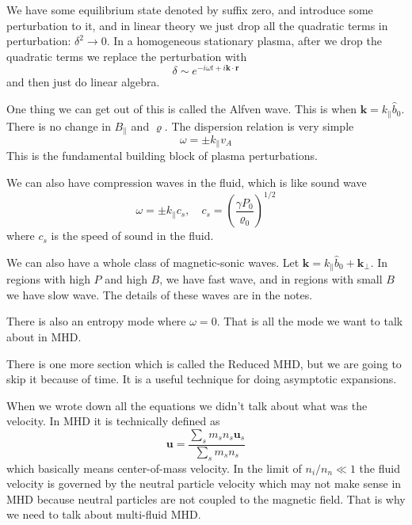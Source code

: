 \documentclass[letterpaper, 11pt]{article}
\numberwithin{equation}{section}
\numberwithin{figure}{section}
\begin{document}
We have some equilibrium state denoted by suffix zero, and introduce some
perturbation to it, and in linear theory we just drop all the quadratic terms in
perturbation: $\delta^2 \longrightarrow 0$. In a homogeneous stationary plasma,
after we drop the quadratic terms we replace the perturbation with
\begin{equation}
  \label{eq:13}
  \delta \sim e^{-i\omega t + i\mathbf{k}\cdot \mathbf{r}}
\end{equation}
and then just do linear algebra.

One thing we can get out of this is called the Alfven wave. This is when
$\mathbf{k} = k_{\parallel}\hat{b}_0$. There is no change in $B_{\parallel}$ and
$\varrho$. The dispersion relation is very simple
\begin{equation}
  \label{eq:14}
  \omega = \pm k_{\parallel}v_A
\end{equation}
This is the fundamental building block of plasma perturbations.

We can also have compression waves in the fluid, which is like sound wave
\begin{equation}
  \label{eq:15}
  \omega = \pm k_{\parallel}c_s,\quad c_s = \left( \frac{\gamma P_0}{\varrho_{0}} \right)^{1/2}
\end{equation}
where $c_s$ is the speed of sound in the fluid.

We can also have a whole class of magnetic-sonic waves. Let $\mathbf{k} =
k_{\parallel}\hat{b}_0 + \mathbf{k}_{\perp}$. In regions with high $P$ and high
$B$, we have fast wave, and in regions with small $B$ we have slow wave. The
details of these waves are in the notes.

There is also an entropy mode where $\omega = 0$. That is all the mode we want
to talk about in MHD.

There is one more section which is called the Reduced MHD, but we are going to
skip it because of time. It is a useful technique for doing asymptotic
expansions.

When we wrote down all the equations we didn't talk about what was the velocity.
In MHD it is technically defined as
\begin{equation}
  \label{eq:16}
  \mathbf{u} = \frac{\sum_sm_sn_s\mathbf{u}_s}{\sum_sm_sn_s}
\end{equation}
which basically means center-of-mass velocity. In the limit of $n_i/n_n \ll 1$
the fluid velocity is governed by the neutral particle velocity which may not
make sense in MHD because neutral particles are not coupled to the magnetic
field. That is why we need to talk about multi-fluid MHD.
\end{document}
